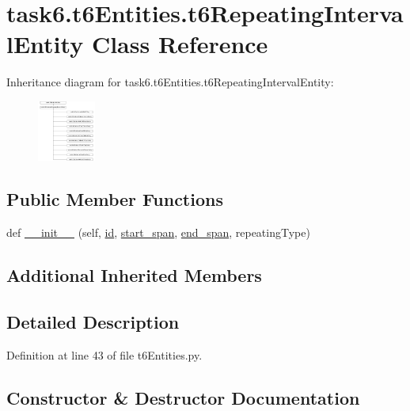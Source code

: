 \hypertarget{classtask6_1_1t6Entities_1_1t6RepeatingIntervalEntity}{}\section{task6.\+t6\+Entities.\+t6\+Repeating\+Interval\+Entity Class Reference}
\label{classtask6_1_1t6Entities_1_1t6RepeatingIntervalEntity}
Inheritance diagram for task6.\+t6\+Entities.\+t6\+Repeating\+Interval\+Entity\+:\begin{figure}[H]
\begin{center}
\leavevmode
\includegraphics[height=2.000000cm]{classtask6_1_1t6Entities_1_1t6RepeatingIntervalEntity}
\end{center}
\end{figure}
\subsection*{Public Member Functions}
\begin{DoxyCompactItemize}
\item 
def \hyperlink{classtask6_1_1t6Entities_1_1t6RepeatingIntervalEntity_a88197dfb2f859962cdc56bf5b4fb9c3f}{\+\_\+\+\_\+init\+\_\+\+\_\+} (self, \hyperlink{classtask6_1_1t6Entities_1_1t6Entity_a96b2e7fb553c920ab2db6f6deb31e3b4}{id}, \hyperlink{classtask6_1_1t6Entities_1_1t6Entity_a8221c36d2995a24200cdfbd74cc9233c}{start\+\_\+span}, \hyperlink{classtask6_1_1t6Entities_1_1t6Entity_a597d42bb02fc9f42277098f0ce21917c}{end\+\_\+span}, repeating\+Type)
\end{DoxyCompactItemize}
\subsection*{Additional Inherited Members}


\subsection{Detailed Description}


Definition at line 43 of file t6\+Entities.\+py.



\subsection{Constructor \& Destructor Documentation}
\mbox{\label{classtask6_1_1t6Entities_1_1t6RepeatingIntervalEntity_a88197dfb2f859962cdc56bf5b4fb9c3f}} 
